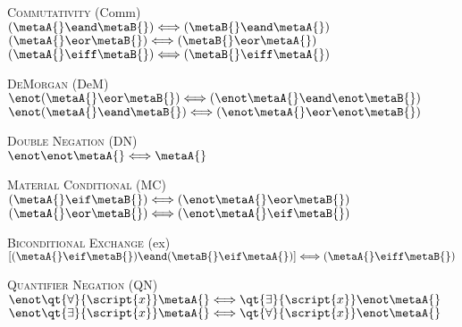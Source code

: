 \textsc{Commutativity} (Comm)\\
$(\metaA{}\eand\metaB{}) \Longleftrightarrow (\metaB{}\eand\metaA{})$\\
$(\metaA{}\eor\metaB{}) \Longleftrightarrow (\metaB{}\eor\metaA{})$\\
$(\metaA{}\eiff\metaB{}) \Longleftrightarrow (\metaB{}\eiff\metaA{})$

\textsc{DeMorgan} (DeM)\\
$\enot(\metaA{}\eor\metaB{}) \Longleftrightarrow (\enot\metaA{}\eand\enot\metaB{})$\\
$\enot(\metaA{}\eand\metaB{}) \Longleftrightarrow (\enot\metaA{}\eor\enot\metaB{})$

\textsc{Double Negation} (DN)\\
$\enot\enot\metaA{} \Longleftrightarrow \metaA{}$

\textsc{Material Conditional} (MC)\\
$(\metaA{}\eif\metaB{}) \Longleftrightarrow (\enot\metaA{}\eor\metaB{})$\\
$(\metaA{}\eor\metaB{}) \Longleftrightarrow (\enot\metaA{}\eif\metaB{})$

\textsc{Biconditional Exchange} ({\eiff}{ex})\\
$[(\metaA{}\eif\metaB{})\eand(\metaB{}\eif\metaA{})] \Longleftrightarrow (\metaA{}\eiff\metaB{})$

\textsc{Quantifier Negation} (QN)\\
$\enot\qt{\forall}{\script{x}}\metaA{} \Longleftrightarrow \qt{\exists}{\script{x}}\enot\metaA{}$\\
$\enot\qt{\exists}{\script{x}}\metaA{} \Longleftrightarrow \qt{\forall}{\script{x}}\enot\metaA{}$





